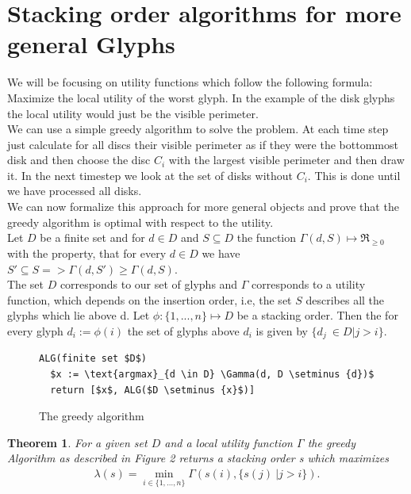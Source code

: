 \documentclass[a4paper,11pt]{article}
\newtheorem{theorem}{Theorem}
\begin{document}
\section{Stacking order algorithms for more general Glyphs}

We will be focusing on utility functions which follow the following formula: Maximize the local utility of the worst glyph. In the example of the disk glyphs the local utility would just be the visible perimeter. \\We can use a simple greedy algorithm to solve the problem. At each time step just calculate for all discs their visible perimeter as if they were the bottommost disk and then choose the disc $C_i$ with the largest visible perimeter and then draw it. In the next timestep we look at the set of disks without $C_i$. This is done until we have processed all disks.\\

We can now formalize this approach for more general objects and prove that the greedy algorithm is optimal with respect to the utility.
\\

Let $D$ be a finite set and for $d \in D$ and $S \subseteq D$ the function $ \Gamma(d, S) \mapsto \Re_{\geq 0} $ with the property, that for every $d \in D$ we have $S' \subseteq S => \Gamma(d, S') \geq \Gamma(d, S)$. \\
The set $D$ corresponds to our set of glyphs and $\Gamma$ corresponds to a utility function, which depends on the insertion order, i.e, the set $S$ describes all the glyphs which lie above d. Let $\phi: \{1,...,n\} \mapsto D$ be a stacking order. Then the for every glyph $d_i:=\phi(i)$ the set of glyphs above $d_i$ is given by $\{d_j\ \in D | j > i\}$.

\begin{figure}[!t]
  \begin{lstlisting}[mathescape=true]
ALG(finite set $D$)
  $x := \text{argmax}_{d \in D} \Gamma(d, D \setminus {d})$
  return [$x$, ALG($D \setminus {x}$)]
  \end{lstlisting}
  \caption{The greedy algorithm}
\end{figure}

\begin{theorem}
  For a given set $D$ and a local utility function $\Gamma$ the greedy Algorithm as described in Figure 2 returns a stacking order s which maximizes\begin{align*}
    \lambda(s) = \min_{i \in \{1,\dots,n\}} \Gamma(s(i), \{s(j)\ | j > i\}).
  \end{align*}
\end{theorem}
\end{document}
